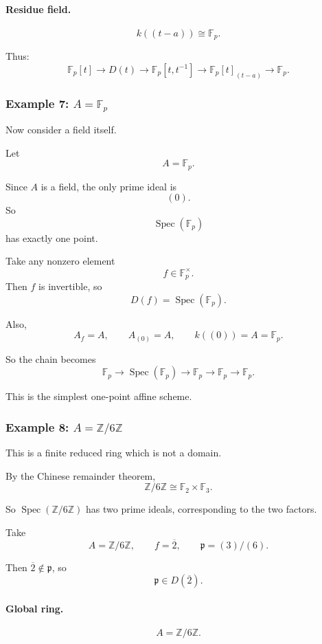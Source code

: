 \documentclass[12pt,a4paper]{article}
\theoremstyle{notespace}
\newcommand{\Spec}{\operatorname{Spec}}
\newcommand{\mf}{\mathfrak}
\theoremstyle{definition}
\begin{document}
\paragraph{Residue field.}
\[
k((t-a))\cong \mathbb F_p.
\]

Thus:
\[
\mathbb F_p[t]
\longrightarrow
D(t)
\longrightarrow
\mathbb F_p[t,t^{-1}]
\longrightarrow
\mathbb F_p[t]_{(t-a)}
\longrightarrow
\mathbb F_p.
\]

\subsubsection{Example 7: \(A=\mathbb F_p\)}

Now consider a field itself.

Let
\[
A=\mathbb F_p.
\]

Since \(A\) is a field, the only prime ideal is
\[
(0).
\]
So
\[
\Spec(\mathbb F_p)
\]
has exactly one point.

Take any nonzero element
\[
f\in \mathbb F_p^\times.
\]
Then \(f\) is invertible, so
\[
D(f)=\Spec(\mathbb F_p).
\]

Also,
\[
A_f=A,
\qquad
A_{(0)}=A,
\qquad
k((0))=A=\mathbb F_p.
\]

So the chain becomes
\[
\mathbb F_p
\longrightarrow
\Spec(\mathbb F_p)
\longrightarrow
\mathbb F_p
\longrightarrow
\mathbb F_p
\longrightarrow
\mathbb F_p.
\]

This is the simplest one-point affine scheme.

\subsubsection{Example 8: \(A=\mathbb Z/6\mathbb Z\)}

This is a finite reduced ring which is not a domain.

By the Chinese remainder theorem,
\[
\mathbb Z/6\mathbb Z \cong \mathbb F_2\times \mathbb F_3.
\]

So \(\Spec(\mathbb Z/6\mathbb Z)\) has two prime ideals, corresponding to the two factors.

Take
\[
A=\mathbb Z/6\mathbb Z,
\qquad
f=\overline{2},
\qquad
\mf p=(3)/(6).
\]

Then \(\overline{2}\notin \mf p\), so
\[
\mf p\in D(\overline{2}).
\]

\paragraph{Global ring.}
\[
A=\mathbb Z/6\mathbb Z.
\]
\end{document}
